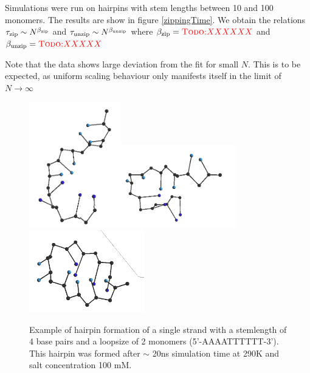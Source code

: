 Simulations were run on hairpins with stem lengths between 10 and 100 monomers. 
The results are show in figure \ref{zippingTime}. We obtain the relations ${\tau_\text{zip}} \sim N^{\beta_\text{zip}}$ and ${\tau_\text{unzip}} \sim N^{\beta_\text{unzip}}$ where ${\beta_\text{zip}} = \textcolor{red}{\textsc{Todo:} XXXXXX}$ and ${\beta_\text{unzip}} = \textcolor{red}{\textsc{Todo:} XXXXX}$

Note that the data shows large deviation from the fit for small $N$. This is to be expected, as uniform scaling behaviour only manifests itself in the limit of $N \to \infty$


\begin{figure}[hbt]
\begin{center}
\includegraphics[width=4cm]{images/results_hairpin1}\includegraphics[width=5cm]{images/results_hairpin2}\includegraphics[width=5cm]{images/results_hairpin3}
\end{center}
\caption{Example of hairpin formation of a single strand with a stemlength of 4 base pairs and a loopsize of 2 monomers (5'-AAAATTTTTT-3'). This hairpin was formed after $\sim$ 20ns simulation time at 290K and salt concentration 100 mM.}
\label{results_hairpin}
\end{figure}




